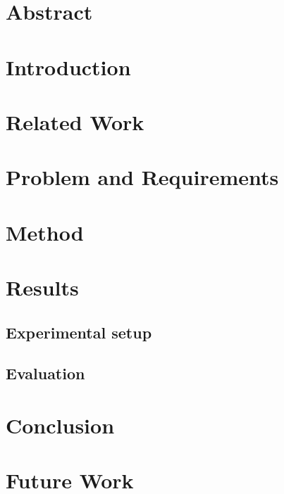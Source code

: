 \documentclass[a4paper, 12pt]{article}
\begin{document}


\setcounter{page}{2}
\tableofcontents
\newpage

\listoftodos
\section*{Abstract}


\section{Introduction}



\section{Related Work}


\section{Problem and Requirements} 


\section{Method}


\section{Results}
\subsection{Experimental setup}
\subsection{Evaluation}
\section{Conclusion}
\section{Future Work}

\printbibliography
\end{document}
